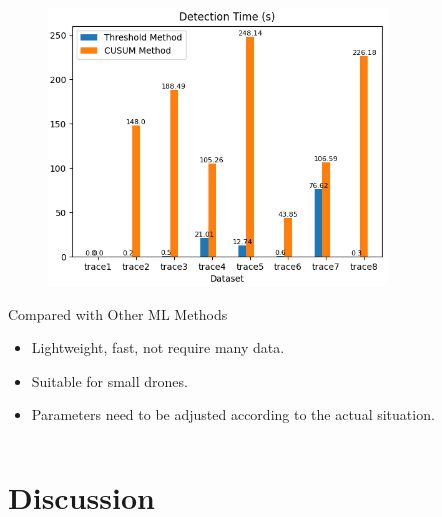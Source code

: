 \documentclass[aspectratio=169, 8pt]{beamer}
\begin{document}
\begin{frame}
\begin{columns}[T]
    \begin{column}{0.5\linewidth}
        \begin{figure}
            \centering
            \includegraphics[width = 0.8\textwidth]{images/detection_time.png}
            \label{fig:enter-label}
        \end{figure}
    \begin{block}{Compared with Other ML Methods}
            \begin{itemize}
                \item Lightweight, fast, not require many data.
                \item Suitable for small drones.
                \item Parameters need to be adjusted according to the actual situation.
            \end{itemize}
        \end{block}
        
    \end{column}
\end{columns}

\end{frame}


\section{Discussion}
\end{document}

